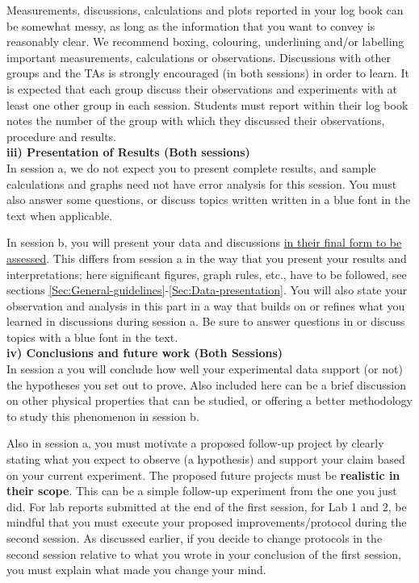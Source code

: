 \documentclass[12pt]{report}
\begin{document}
Measurements, discussions, calculations and plots reported in your log book can be somewhat messy, as long as the information that you want to convey is reasonably clear.  We recommend boxing, colouring, underlining and/or labelling important measurements, calculations or observations. 
Discussions with other groups and the TAs is strongly encouraged (in both sessions) in order to learn. 
It is expected that each group discuss their observations and experiments with at least one other group in each session.
Students must report within their log book notes the number of the group with which they discussed their observations, procedure and results.
 \\

\noindent \textbf{iii) Presentation of Results (Both sessions)}\\
  In session a, we do not expect you to present complete results, and sample calculations and graphs need not have error analysis for this session. {\color{blue}You must also  answer some questions, or discuss topics written written in a blue font in the text when applicable. }

In session b, you will present your data and discussions \underline{in their final form to be assessed}. This differs from session a in the way that you present your results and interpretations; here significant figures, graph rules, etc., have to be followed, see sections \ref{Sec:General-guidelines}-\ref{Sec:Data-presentation}. 
You will also state your observation and analysis in this part in a way that builds on or refines what you learned in discussions during session a. {\color{blue} Be sure to answer questions in or discuss topics with a blue font in the text.}  \\

\noindent \textbf{iv) Conclusions and future work (Both Sessions)  }\\
In session a you will conclude how well your experimental data support (or not) the hypotheses you set out to prove. Also included here can be a brief discussion on other physical properties that can be studied, or offering a better methodology to study this phenomenon in session b.

Also in session a, you must motivate a proposed follow-up project by clearly stating what you expect to observe (a hypothesis) and support your claim based on your current experiment. The proposed future projects must be \textbf{realistic in their scope}.
This can be a simple follow-up experiment from the one you just did. 
For lab reports submitted at the end of the first session, for Lab 1 and 2, be mindful that you must execute your proposed improvements/protocol during the second session. As discussed earlier, if you decide to change protocols in the second session relative to what you wrote in your conclusion of the first session, you must explain what made you change your mind. 
\end{document}
